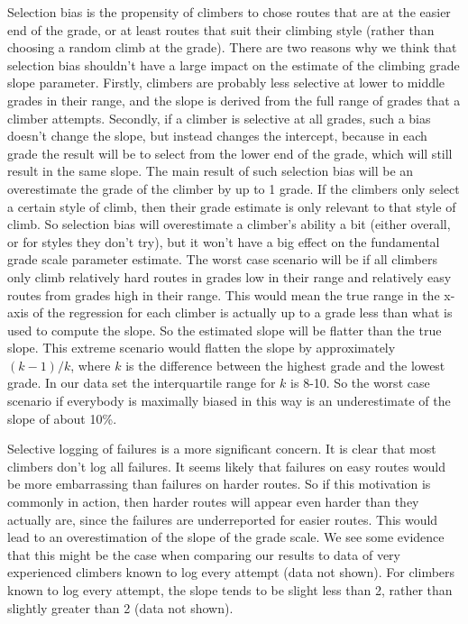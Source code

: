 \documentclass[12pt]{article}
\begin{document}
Selection bias is the propensity of climbers to chose routes that are at the easier end of the grade, or at least routes that suit their climbing style (rather than choosing a random climb at the grade). There are two reasons why we think that selection bias shouldn't have a large impact on the estimate of the climbing grade slope parameter. Firstly, climbers are probably less selective at lower to middle grades in their range, and the slope is derived from the full range of grades that a climber attempts. Secondly, if a climber is selective at all grades, such a bias doesn't change the slope, but instead changes the intercept, because in each grade the result will be to select from the lower end of the grade, which will still result in the same slope. The main result of such selection bias will be an overestimate the grade of the climber by up to 1 grade. If the climbers only select a certain style of climb, then their grade estimate is only relevant to that style of climb. So selection bias will overestimate a climber's ability a bit (either overall, or for styles they don't try), but it won't have a big effect on the fundamental grade scale parameter estimate. The worst case scenario will be if all climbers only climb relatively hard routes in grades low in their range and relatively easy routes from grades high in their range. This would mean the true range in the x-axis of the regression for each climber is actually up to a grade less than what is used to compute the slope. So the estimated slope will be flatter than the true slope. This extreme scenario would flatten the slope by approximately $(k-1)/k$, where $k$ is the difference between the highest grade and the lowest grade. In our data set the interquartile range for $k$ is 8-10. So the worst case scenario if everybody is maximally biased in this way is an underestimate of the slope of about 10\%.

Selective logging of failures is a more significant concern. It is clear that most climbers don't log all failures. It seems likely that failures on easy routes would be more embarrassing than failures on harder routes. So if this motivation is commonly in action, then harder routes will appear even harder than they actually are, since the failures are underreported for easier routes. This would lead to an overestimation of the slope of the grade scale. We see some evidence that this might be the case when comparing our results to data of very experienced climbers known to log every attempt (data not shown). For climbers known to log every attempt, the slope tends to be slight less than 2, rather than slightly greater than 2 (data not shown).
\end{document}
